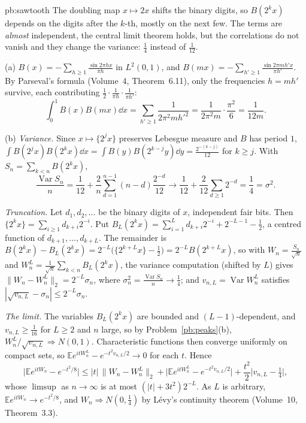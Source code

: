 \begin{solution}{pb:sawtooth}
\idea The doubling map $x\mapsto2x$ shifts the binary digits, so $B(2^kx)$ depends on the digits after the $k$-th, mostly on the next few. The terms are
\emph{almost} independent, the central limit theorem holds, but the correlations do not vanish and they change the variance: $\frac14$ instead of $\frac1{12}$.

\writeup (a) $B(x)=-\sum_{h\ge1}\frac{\sin2\pi hx}{\pi h}$ in $L^2(0,1)$, and $B(mx)=-\sum_{h'\ge1}\frac{\sin2\pi mh'x}{\pi h'}$. By Parseval's formula (Volume~4, Theorem~6.11), only the
frequencies $h=mh'$ survive, each contributing $\frac12\cdot\frac1{\pi h}\cdot\frac1{\pi h'}$:
\[
\int_0^1B(x)B(mx)\dd x=\sum_{h'\ge1}\frac1{2\pi^2mh'^2}=\frac1{2\pi^2m}\cdot\frac{\pi^2}6=\frac1{12m}.
\]

(b) \emph{Variance.} Since $x\mapsto\{2^jx\}$ preserves Lebesgue measure and $B$ has period $1$, $\int B(2^jx)B(2^kx)\dd x=\int B(y)B(2^{k-j}y)\dd y=\frac{2^{-(k-j)}}{12}$ for
$k\ge j$. With $S_n=\sum_{k<n}B(2^kx)$,
\[
\frac{\operatorname{Var}S_n}n=\frac1{12}+\frac2n\sum_{d=1}^{n-1}(n-d)\frac{2^{-d}}{12}\longrightarrow\frac1{12}+\frac2{12}\sum_{d\ge1}2^{-d}=\frac14=\sigma^2.
\]

\emph{Truncation.} Let $d_1,d_2,\dots$ be the binary digits of $x$, independent fair bits. Then $\{2^kx\}=\sum_{i\ge1}d_{k+i}2^{-i}$. Put
$B_L(2^kx)=\sum_{i=1}^Ld_{k+i}2^{-i}+2^{-L-1}-\frac12$, a centred function of $d_{k+1},\dots,d_{k+L}$. The remainder is
$B(2^kx)-B_L(2^kx)=2^{-L}\bigl(\{2^{k+L}x\}-\frac12\bigr)=2^{-L}B(2^{k+L}x)$, so with $W_n=\frac{S_n}{\sqrt n}$ and $W_n^L=\frac1{\sqrt n}\sum_{k<n}B_L(2^kx)$, the variance
computation (shifted by $L$) gives $\|W_n-W_n^L\|_2=2^{-L}\sigma_n$, where $\sigma_n^2=\frac{\operatorname{Var}S_n}n\to\frac14$; and $v_{n,L}=\operatorname{Var}W_n^L$ satisfies
$|\sqrt{v_{n,L}}-\sigma_n|\le2^{-L}\sigma_n$.

\emph{The limit.} The variables $B_L(2^kx)$ are bounded and $(L-1)$-dependent, and $v_{n,L}\ge\frac1{16}$ for $L\ge2$ and $n$ large, so by Problem~\ref{pb:peaks}(b),
$W_n^L/\sqrt{v_{n,L}}\Rightarrow N(0,1)$. Characteristic functions then converge uniformly on compact sets, so $\mathbb Ee^{itW_n^L}-e^{-t^2v_{n,L}/2}\to0$ for each $t$. Hence
\[
\bigl|\mathbb Ee^{itW_n}-e^{-t^2/8}\bigr|\le|t|\,\|W_n-W_n^L\|_2+\bigl|\mathbb Ee^{itW_n^L}-e^{-t^2v_{n,L}/2}\bigr|+\frac{t^2}2\bigl|v_{n,L}-\tfrac14\bigr|,
\]
whose $\limsup$ as $n\to\infty$ is at most $(|t|+3t^2)2^{-L}$. As $L$ is arbitrary, $\mathbb Ee^{itW_n}\to e^{-t^2/8}$, and $W_n\Rightarrow N(0,\frac14)$ by Lévy's continuity
theorem (Volume~10, Theorem~3.3).


\end{solution}
